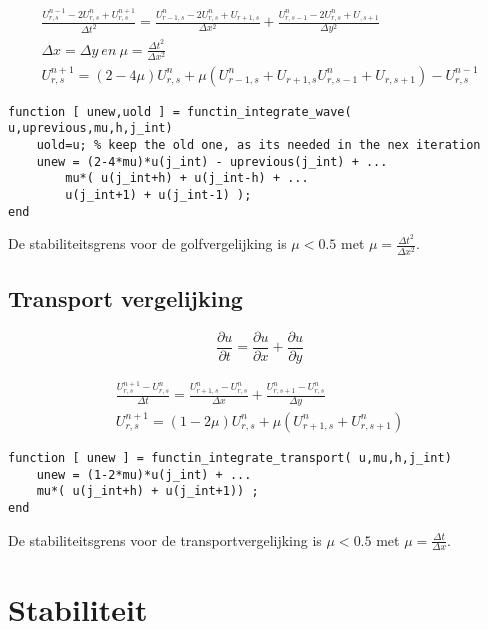 \documentclass[11pt]{article} %
\begin{document}
		\begin{eqnarray}
			\frac{U_{r,s}^{n-1} - 2U_{r,s}^{n}+U_{r,s}^{n+1} }{\Delta t^2} 
			=
			\frac{U_{r-1,s}^n - 2 U_{r,s}^n + U_{r+1,s}}{\Delta x^2} + 
			\frac{U_{r,s-1}^n - 2 U_{r,s}^n + U_{,s+1} }{\Delta y^2} \\
			\Delta x = \Delta y  \ en \  \mu=\frac{\Delta t^2}{\Delta x^2} \\
			U_{r,s}^{n+1} = ( 2-4\mu )U_{r,s}^n + \mu (U_{r-1,s}^n  + U_{r+1,s}
			U_{r,s-1}^n  + U_{r,s+1}) - U_{r,s}^{n-1}
		\end{eqnarray}
\begin{lstlisting}[caption=Code Explicit Euler,label={lst:expl_euler}]
function [ unew,uold ] = functin_integrate_wave( u,uprevious,mu,h,j_int)
	uold=u; % keep the old one, as its needed in the nex iteration
	unew = (2-4*mu)*u(j_int) - uprevious(j_int) + ...
		mu*( u(j_int+h) + u(j_int-h) + ...
		u(j_int+1) + u(j_int-1) );
end
\end{lstlisting}
De stabiliteitsgrens voor de golfvergelijking is $\mu < 0.5 $ met $\mu=\frac{\Delta t^2}{\Delta x^2}$.  

	\subsection{Transport vergelijking}
		\begin{equation}
			\frac{\partial u}{\partial t} = \frac{\partial u}{\partial x} + \frac{\partial u}{\partial y}
		\end{equation}
		
		\begin{eqnarray}
			\frac{U_{r,s}^{n+1} - U_{r,s}^n}{\Delta t} = 
			\frac{U^n_{r+1,s} -U^n_{r,s}}{\Delta x} +
			\frac{U^n_{r,s+1} -U^n_{r,s}}{\Delta y} \\
			U_{r,s}^{n+1} = (1 - 2 \mu)U^n_{r,s} + \mu (U^n_{r+1,s}+U^n_{r,s+1})
		\end{eqnarray}
\begin{lstlisting}[caption=Code Explicit Euler,label={lst:expl_euler}]
function [ unew ] = functin_integrate_transport( u,mu,h,j_int)
	unew = (1-2*mu)*u(j_int) + ... 
	mu*( u(j_int+h) + u(j_int+1)) ;
end
\end{lstlisting}
De stabiliteitsgrens voor de transportvergelijking is $\mu < 0.5 $ met $\mu=\frac{\Delta t}{\Delta x}$.  

\section{Stabiliteit}
\end{document}
